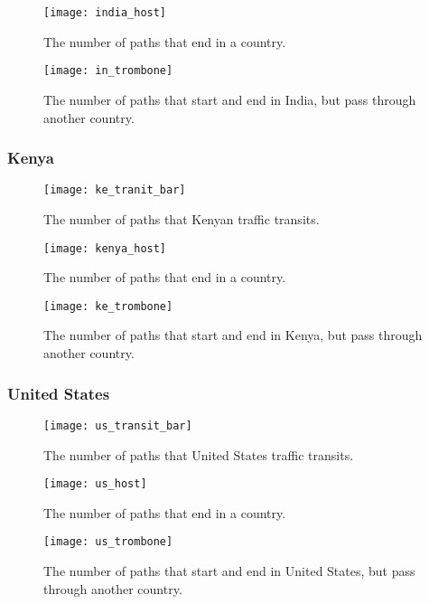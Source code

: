 \begin{figure}[t!]
\centering
\texttt{[image: india\_host]}
\caption{The number of paths that end in a country.}
\label{fig:host_in}
\end{figure} 

\begin{figure}
\centering
\texttt{[image: in\_trombone]}
\caption{The number of paths that start and end in India, but pass through another country.}
\label{fig:trombone_in}
\end{figure}

\subsubsection{Kenya}

\begin{figure}
\centering
\texttt{[image: ke\_tranit\_bar]}
\caption{The number of paths that Kenyan traffic transits.}
\label{fig:transit_ke}
\end{figure}

\begin{figure}[t!]
\centering
\texttt{[image: kenya\_host]}
\caption{The number of paths that end in a country.}
\label{fig:host_ke}
\end{figure} 

\begin{figure}
\centering
\texttt{[image: ke\_trombone]}
\caption{The number of paths that start and end in Kenya, but pass through another country.}
\label{fig:trombone_ke}
\end{figure}

\subsubsection{United States}

\begin{figure}
\centering
\texttt{[image: us\_transit\_bar]}
\caption{The number of paths that United States traffic transits.}
\label{fig:transit_us}
\end{figure}

\begin{figure}[t!]
\centering
\texttt{[image: us\_host]}
\caption{The number of paths that end in a country.}
\label{fig:host_us}
\end{figure} 

\begin{figure}
\centering
\texttt{[image: us\_trombone]}
\caption{The number of paths that start and end in United States, but pass through another country.}
\label{fig:trombone_us}
\end{figure}

